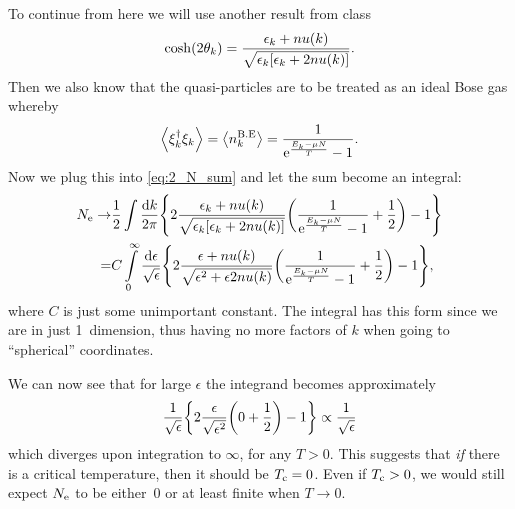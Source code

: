 \documentclass[11pt,letter, swedish, english
]{article}
\begin{document}
To continue from here we will use another result from class
\begin{equation}
\cosh(2\theta_k)=\frac{\epsilon_k+nu(k)}
{\sqrt{\epsilon_k\qty[\epsilon_k+2nu(k)]}}.
\end{equation}
Then we also know that the quasi-particles are to be treated as an
ideal Bose gas whereby
\begin{equation}
\ev{\xi^\dagger_k\xi_k
}=\ev{n_k^{\text{B.E}}}=\frac{1}{\ee^{\frac{E_k-\mu N}{T}}-1}.
\end{equation}
Now we plug this into \eqref{eq:2_N_sum} and let the sum become an
integral:
\begin{equation}
\begin{aligned}
\Ne\to&
\frac{1}{2}\int \frac{\dd{k}}{2\pi}\qty{
2\frac{\epsilon_k+nu(k)}{\sqrt{\epsilon_k\qty[\epsilon_k+2nu(k)]}}
\qty(\frac{1}{\ee^{\frac{E_k-\mu N}{T}}-1}+\frac{1}{2})-1
}\\
=&C\int_0^\infty\frac{\rd\epsilon}{\sqrt{\epsilon}}\qty{
2\frac{\epsilon+nu(k)}{\sqrt{\epsilon^2+\epsilon2nu(k)}}
\qty(\frac{1}{\ee^{\frac{E_k-\mu N}{T}}-1}+\frac{1}{2})-1
},
\end{aligned}
\end{equation}
where $C$ is just some unimportant constant. The integral has this
form since we are in just 1~dimension, thus having no more factors of
$k$ when going to ``spherical'' coordinates.

We can now see that for large $\epsilon$ the integrand becomes approximately
\begin{equation}
\frac{1}{\sqrt{\epsilon}}\qty{
2\frac{\epsilon}{\sqrt{\epsilon^2}}
\qty(0+\frac{1}{2})-1}
\propto\frac{1}{\sqrt{\epsilon}}
\end{equation}
which diverges upon integration to $\infty$, for any $T>0$. This suggests that
\emph{if} there is a critical temperature, then it should be
$T_{\text{c}}=0$. Even if $T_{\text{c}}>0$, we would still expect $N_{\text{e}}$ to be either~0
or at least finite when $T\to0$.
\end{document}
